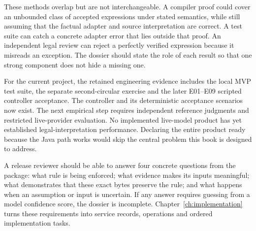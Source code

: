 These methods overlap but are not interchangeable. A compiler proof could cover
an unbounded class of accepted expressions under stated semantics, while still
assuming that the factual adapter and source interpretation are correct. A test
suite can catch a concrete adapter error that lies outside that proof. An
independent legal review can reject a perfectly verified expression because it
misreads an exception. The dossier should state the role of each result so that
one strong component does not hide a missing one.


For the current project, the retained engineering evidence includes the local
MVP test suite, the separate second-circular exercise and the later E01--E09
scripted controller acceptance. The controller and its deterministic
acceptance scenarios now exist. The next empirical step requires independent
reference judgments and restricted live-provider evaluation. No implemented
live-model product has yet established legal-interpretation performance. Declaring the entire product ready because the Java path works would
skip the central problem this book is designed to address.

A release reviewer should be able to answer four concrete questions from the
package: what rule is being enforced; what evidence makes its inputs meaningful;
what demonstrates that these exact bytes preserve the rule; and what happens when
an assumption or input is uncertain. If any answer requires guessing from a model
confidence score, the dossier is incomplete. Chapter~\ref{ch:implementation} turns
these requirements into service records, operations and ordered implementation
tasks.

